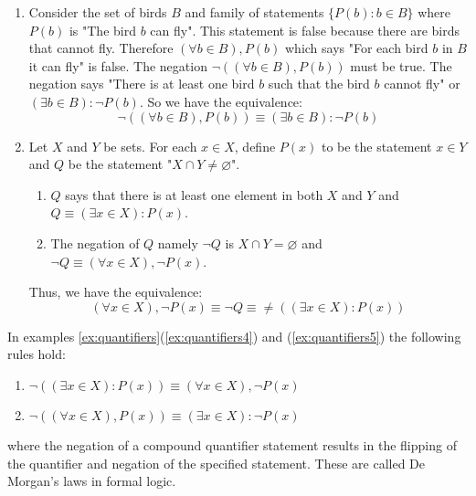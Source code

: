 \begin{example}
\begin{enumerate}
        \item Consider the set of birds $B$ and family of statements $\{P(b) : b \in B\}$ where $P(b)$ is "The bird $b$ can fly". This statement is false because there are birds that cannot fly. Therefore $(\forall b \in B), P(b)$ which says "For each bird $b$ in $B$ it can fly" is false. The negation $\neg ((\forall b \in B),P(b))$ must be true. The negation says "There is at least one bird $b$ such that the bird $b$ cannot fly" or $(\exists b \in B): \neg P(b)$. So we have the equivalence:
            $$
            \neg((\forall b \in B), P(b)) \equiv (\exists b \in B):\neg P(b)
            $$
            \label{ex:quantifiers4}

        \item Let $X$ and $Y$ be sets. For each $x \in X$, define $P(x)$ to be the statement $x \in Y$ and $Q$ be the statement "$X \cap Y \neq \varnothing$".
            \begin{enumerate}[label=(\alph*)]
                \item $Q$ says that there is at least one element in both $X$ and $Y$ and $Q \equiv (\exists x \in X): P(x)$.
                \item The negation of $Q$ namely $\neg Q$ is $X \cap Y = \varnothing$ and $\neg Q \equiv (\forall x \in X), \neg P(x)$.
            \end{enumerate}
            Thus, we have the equivalence: \label{ex:quantifiers5}
            $$
            (\forall x \in X), \neg P(x) \equiv \neg Q \equiv \neq((\exists x \in X) : P(x))
            $$
    \end{enumerate}
    \label{ex:quantifiers}
\end{example}

In examples \ref{ex:quantifiers}(\ref{ex:quantifiers4}) and (\ref{ex:quantifiers5}) the following rules hold:

\begin{enumerate}
    \item $\neg((\exists x \in X): P(x)) \equiv (\forall x \in X), \neg P(x)$
    \item $\neg((\forall x \in X), P(x)) \equiv (\exists x \in X): \neg P(x)$
\end{enumerate}

\noindent where the negation of a compound quantifier statement results in the flipping of the quantifier and negation of the specified statement. These are called De Morgan's laws in formal logic.

